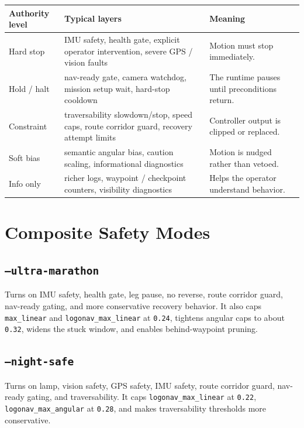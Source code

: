 \documentclass[11pt]{article}
\begin{document}
\begin{center}
\begin{tabular}{p{}p{}p{}}
\toprule
\textbf{Authority level} & \textbf{Typical layers} & \textbf{Meaning} \\
\midrule
Hard stop & IMU safety, health gate, explicit operator intervention, severe GPS / vision faults & Motion must stop immediately. \\
Hold / halt & nav-ready gate, camera watchdog, mission setup wait, hard-stop cooldown & The runtime pauses until preconditions return. \\
Constraint & traversability slowdown/stop, speed caps, route corridor guard, recovery attempt limits & Controller output is clipped or replaced. \\
Soft bias & semantic angular bias, caution scaling, informational diagnostics & Motion is nudged rather than vetoed. \\
Info only & richer logs, waypoint / checkpoint counters, visibility diagnostics & Helps the operator understand behavior. \\
\bottomrule
\end{tabular}
\end{center}

\section{Composite Safety Modes}

\subsection*{\texttt{--ultra-marathon}}

Turns on IMU safety, health gate, leg pause, no reverse, route corridor guard,
nav-ready gating, and more conservative recovery behavior. It also caps
\texttt{max\_linear} and \texttt{logonav\_max\_linear} at \texttt{0.24}, tightens
angular caps to about \texttt{0.32}, widens the stuck window, and enables
behind-waypoint pruning.

\subsection*{\texttt{--night-safe}}

Turns on lamp, vision safety, GPS safety, IMU safety, route corridor guard,
nav-ready gating, and traversability. It caps \texttt{logonav\_max\_linear} at
\texttt{0.22}, \texttt{logonav\_max\_angular} at \texttt{0.28}, and makes
traversability thresholds more conservative.
\end{document}
